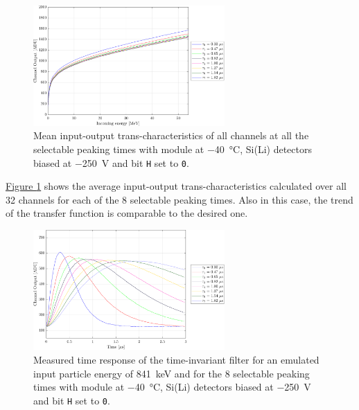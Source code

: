 \begin{figure}[h!]
    \centering
    \includegraphics[width=0.65\textwidth]{Images/chap3/results/FDT_MODULE_40C_250V_allpt.pdf}
    \caption{Mean input-output trans-characteristics of all channels at all the selectable
peaking times with module at \SI{-40}{\celsius}, Si(Li) detectors biased at \SI{-250}{\volt} and bit \texttt{H} set to \texttt{0}.}
    \label{figFDTmodule40C250VALLPT}
\end{figure}

\par
\hyperref[figFDTmodule40C250VALLPT]{Figure \ref{figFDTmodule40C250VALLPT}} shows the average input-output trans-characteristics calculated over all 32 channels for each of the 8 selectable peaking times. Also in this case, the trend of the transfer function is comparable to the desired one.

\begin{figure}[h!]
    \centering
    \includegraphics[width=0.65\textwidth]{Images/chap3/results/WAVEFORM_MODULE_40C_250V_allpt.pdf}
    \caption{Measured time response of the time-invariant filter for an emulated input particle energy of \SI{841}{\kilo\electronvolt} and for the 8 selectable peaking times with module at \SI{-40}{\celsius}, Si(Li) detectors biased at \SI{-250}{\volt} and bit \texttt{H} set to \texttt{0}.}
    \label{figWAVEmoduleALLPT}
\end{figure}

